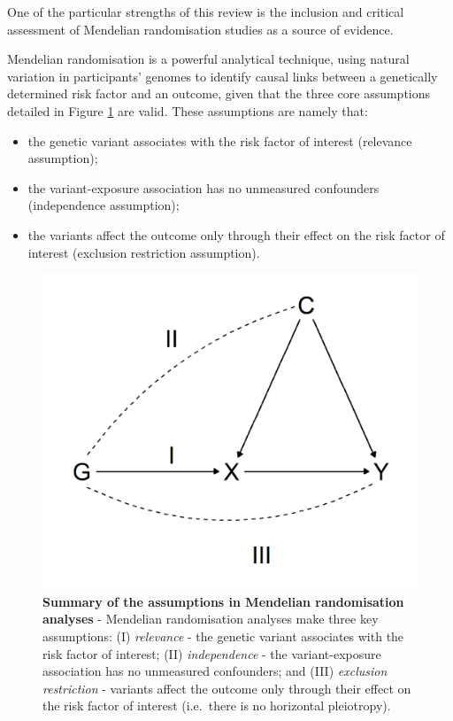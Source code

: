\documentclass[a4paper, twoside]{templates/ociamthesis}
\providecommand{\tightlist}{%
  \setlength{\itemsep}{0pt}\setlength{\parskip}{0pt}}
\begin{document}
One of the particular strengths of this review is the inclusion and critical assessment of Mendelian randomisation studies as a source of evidence.

Mendelian randomisation is a powerful analytical technique, using natural variation in participants' genomes to identify causal links between a genetically determined risk factor and an outcome, given that the three core assumptions detailed in Figure \ref{fig:mrAssumptions} are valid. These assumptions are namely that:

\begin{itemize}
\tightlist
\item
  the genetic variant associates with the risk factor of interest (relevance assumption);
\item
  the variant-exposure association has no unmeasured confounders (independence assumption);
\item
  the variants affect the outcome only through their effect on the risk factor of interest (exclusion restriction assumption).
\end{itemize}





\begin{figure}[H]

{\centering \includegraphics[width=0.7\linewidth]{figures/sys-rev/mrAssumptions} 

}

\caption[Summary of the assumptions in Mendelian randomisation analyses]{\textbf{Summary of the assumptions in Mendelian randomisation analyses} - Mendelian randomisation analyses make three key assumptions: (I) \emph{relevance} - the genetic variant associates with the risk factor of interest; (II) \emph{independence} - the variant-exposure association has no unmeasured confounders; and (III) \emph{exclusion restriction} - variants affect the outcome only through their effect on the risk factor of interest (i.e.~there is no horizontal pleiotropy).}\label{fig:mrAssumptions}
\end{figure}
\end{document}
